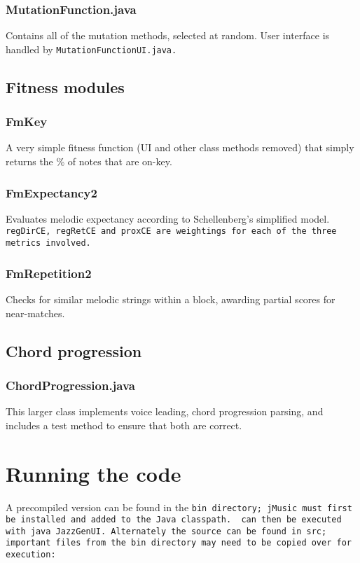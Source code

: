 \subsection*{MutationFunction.java}
Contains all of the mutation methods, selected at random. User interface is handled by \tt{MutationFunctionUI.java}.


\section{Fitness modules}
\subsection*{FmKey}
A very simple fitness function (UI and other class methods removed) that simply returns the \% of notes that are
on-key.


\subsection*{FmExpectancy2}
Evaluates melodic expectancy according to Schellenberg's simplified model. \tt{regDirCE}, \tt{regRetCE} and \tt{proxCE} are weightings
for each of the three metrics involved.


\subsection*{FmRepetition2}
Checks for similar melodic strings within a block, awarding partial scores for near-matches.


\section{Chord progression}
\subsection*{ChordProgression.java}
This larger class implements voice leading, chord progression parsing, and includes a test method to ensure
that both are correct.


\chapter{Running the code}

A precompiled version can be found in the \tt{bin} directory; jMusic must first
be installed and added to the Java classpath. \jg\ can then be executed with \tt{java JazzGenUI}. Alternately
the source can be found in \tt{src}; important files from the \tt{bin} directory may need to be copied over
for execution:

